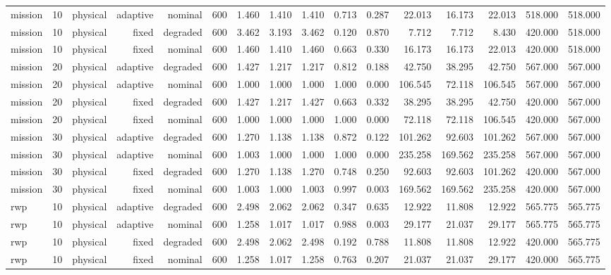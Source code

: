 \begin{tabular}{lrrrrrrrrrrrrrrr}
mission & 10 & physical & adaptive & nominal & 600 & 1.460 & 1.410 & 1.410 & 0.713 & 0.287 & 22.013 & 16.173 & 22.013 & 518.000 & 518.000 \\
mission & 10 & physical & fixed & degraded & 600 & 3.462 & 3.193 & 3.462 & 0.120 & 0.870 & 7.712 & 7.712 & 8.430 & 420.000 & 518.000 \\
mission & 10 & physical & fixed & nominal & 600 & 1.460 & 1.410 & 1.460 & 0.663 & 0.330 & 16.173 & 16.173 & 22.013 & 420.000 & 518.000 \\
mission & 20 & physical & adaptive & degraded & 600 & 1.427 & 1.217 & 1.217 & 0.812 & 0.188 & 42.750 & 38.295 & 42.750 & 567.000 & 567.000 \\
mission & 20 & physical & adaptive & nominal & 600 & 1.000 & 1.000 & 1.000 & 1.000 & 0.000 & 106.545 & 72.118 & 106.545 & 567.000 & 567.000 \\
mission & 20 & physical & fixed & degraded & 600 & 1.427 & 1.217 & 1.427 & 0.663 & 0.332 & 38.295 & 38.295 & 42.750 & 420.000 & 567.000 \\
mission & 20 & physical & fixed & nominal & 600 & 1.000 & 1.000 & 1.000 & 1.000 & 0.000 & 72.118 & 72.118 & 106.545 & 420.000 & 567.000 \\
mission & 30 & physical & adaptive & degraded & 600 & 1.270 & 1.138 & 1.138 & 0.872 & 0.122 & 101.262 & 92.603 & 101.262 & 567.000 & 567.000 \\
mission & 30 & physical & adaptive & nominal & 600 & 1.003 & 1.000 & 1.000 & 1.000 & 0.000 & 235.258 & 169.562 & 235.258 & 567.000 & 567.000 \\
mission & 30 & physical & fixed & degraded & 600 & 1.270 & 1.138 & 1.270 & 0.748 & 0.250 & 92.603 & 92.603 & 101.262 & 420.000 & 567.000 \\
mission & 30 & physical & fixed & nominal & 600 & 1.003 & 1.000 & 1.003 & 0.997 & 0.003 & 169.562 & 169.562 & 235.258 & 420.000 & 567.000 \\
rwp & 10 & physical & adaptive & degraded & 600 & 2.498 & 2.062 & 2.062 & 0.347 & 0.635 & 12.922 & 11.808 & 12.922 & 565.775 & 565.775 \\
rwp & 10 & physical & adaptive & nominal & 600 & 1.258 & 1.017 & 1.017 & 0.988 & 0.003 & 29.177 & 21.037 & 29.177 & 565.775 & 565.775 \\
rwp & 10 & physical & fixed & degraded & 600 & 2.498 & 2.062 & 2.498 & 0.192 & 0.788 & 11.808 & 11.808 & 12.922 & 420.000 & 565.775 \\
rwp & 10 & physical & fixed & nominal & 600 & 1.258 & 1.017 & 1.258 & 0.763 & 0.207 & 21.037 & 21.037 & 29.177 & 420.000 & 565.775 \\

\end{tabular}
